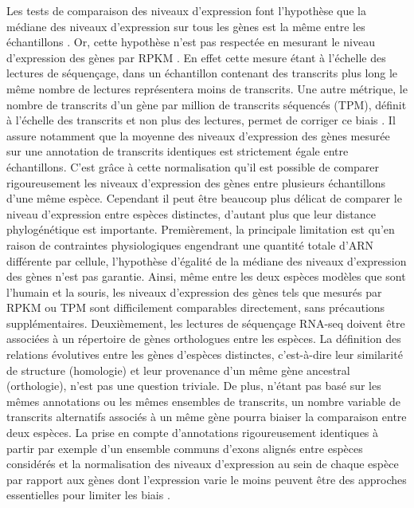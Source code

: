 Les tests de comparaison des niveaux d’expression font l’hypothèse que la médiane des niveaux d’expression sur tous les gènes est la même entre les échantillons \citep{robinson_edger_2010, love_moderated_2014}. Or, cette hypothèse n’est pas respectée en mesurant le niveau d’expression des gènes par \acrshort{RPKM} \citep{wagner_measurement_2012}. En effet cette mesure étant à l’échelle des lectures de séquençage, dans un échantillon contenant des transcrits plus long le même nombre de lectures représentera moins de transcrits. Une autre métrique, le nombre de transcrits d’un gène par million de transcrits séquencés (TPM), définit à l’échelle des transcrits et non plus des lectures, permet de corriger ce biais \citep{wagner_measurement_2012}. Il assure notamment que la moyenne des niveaux d’expression des gènes mesurée sur une annotation de transcrits identiques est strictement égale entre échantillons. C’est grâce à cette normalisation qu’il est possible de comparer rigoureusement les niveaux d’expression des gènes entre plusieurs échantillons d’une même espèce. Cependant il peut être beaucoup plus délicat de comparer le niveau d’expression entre espèces distinctes, d’autant plus que leur distance phylogénétique est importante. Premièrement, la principale limitation est qu’en raison de contraintes physiologiques engendrant une quantité totale d’\acrshort{ARN} différente par cellule, l’hypothèse d’égalité de la médiane des niveaux d’expression des gènes n’est pas garantie. Ainsi, même entre les deux espèces modèles que sont l’humain et la souris, les niveaux d’expression des gènes tels que mesurés par \acrshort{RPKM} ou TPM sont difficilement comparables directement, sans précautions supplémentaires. Deuxièmement, les lectures de séquençage \acrshort{RNA-seq} doivent être associées à un répertoire de gènes orthologues entre les espèces. La définition des relations évolutives entre les gènes d’espèces distinctes, c'est-à-dire leur similarité de structure (homologie) et leur provenance d’un même gène ancestral (orthologie), n’est pas une question triviale. De plus, n’étant pas basé sur les mêmes annotations ou les mêmes ensembles de transcrits, un nombre variable de transcrits alternatifs associés à un même gène pourra biaiser la comparaison entre deux espèces. La prise en compte d’annotations rigoureusement identiques à partir par exemple d’un ensemble communs d’exons alignés entre espèces considérés et la normalisation des niveaux d’expression au sein de chaque espèce par rapport aux gènes dont l’expression varie le moins peuvent être des approches essentielles pour limiter les biais \citep{brawand_evolution_2011}.

